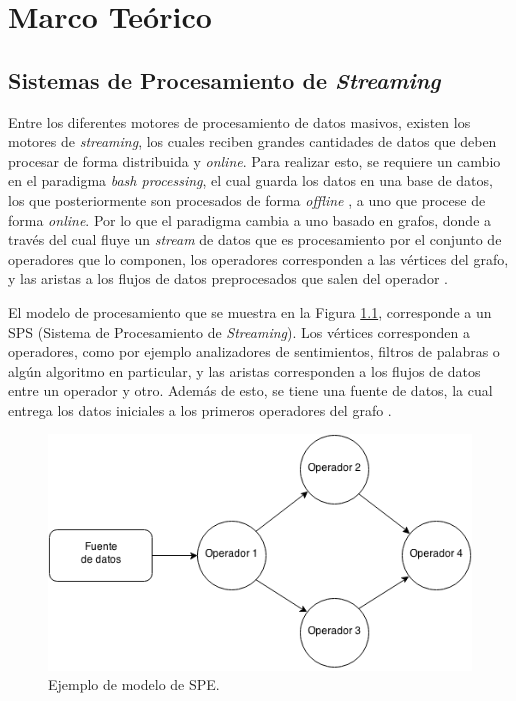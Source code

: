 \chapter{Marco Teórico}
\label{cap:marcoTeorico}

\section{Sistemas de Procesamiento de \textit{Streaming}}

Entre los diferentes motores de procesamiento de datos masivos, existen los motores de \textsl{streaming}, los cuales reciben grandes cantidades de datos que deben procesar de forma distribuida y \textsl{online}. Para realizar esto, se requiere un cambio en el paradigma \textsl{bash processing}, el cual guarda los datos en una base de datos, los que posteriormente son procesados de forma \textsl{offline} \citep{HawwashN14}, a uno que procese de forma \textsl{online}. Por lo que el paradigma cambia a uno basado en grafos, donde a través del cual fluye un \textsl{stream} de datos que es procesamiento por el conjunto de operadores que lo componen, los operadores corresponden a las vértices del grafo, y las aristas a los flujos de datos preprocesados que salen del operador \citep{Shahrivari14}.

El modelo de procesamiento que se muestra en la Figura \ref{fig:grafo}, corresponde a un SPS (Sistema de Procesamiento de \textit{Streaming}). Los vértices corresponden a operadores, como por ejemplo analizadores de sentimientos, filtros de palabras o algún algoritmo en particular, y las aristas corresponden a los flujos de datos entre un operador y otro. Además de esto, se tiene una fuente de datos, la cual entrega los datos iniciales a los primeros operadores del grafo \citep{AppelFFB12}.

\begin{figure}[ht!]
  \centering
    \includegraphics[scale=0.5]{images/Grafo.png}
  \caption{Ejemplo de modelo de SPE.}
  \label{fig:grafo}
\end{figure}

